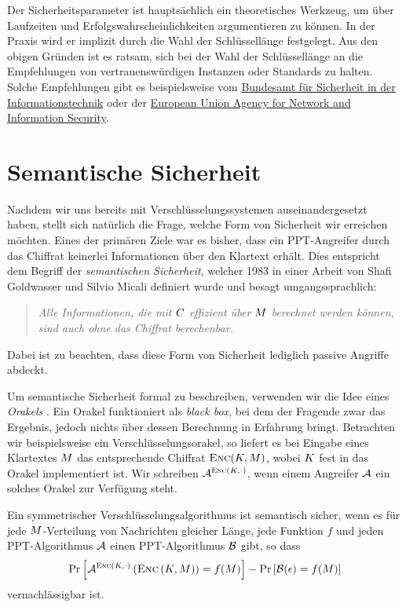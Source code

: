 Der Sicherheitsparameter ist hauptsächlich ein theoretisches Werkzeug,
um über Laufzeiten und Erfolgswahrscheinlichkeiten argumentieren zu
können. In der Praxis wird er implizit durch die Wahl der Schlüssellänge
festgelegt. Aus den obigen Gründen ist es ratsam, sich bei der Wahl der
Schlüssellänge an die Empfehlungen von vertrauenswürdigen Instanzen oder
Standards zu halten. Solche Empfehlungen gibt es beispielsweise vom
\href{https://www.bsi.bund.de/DE/Publikationen/TechnischeRichtlinien/tr02102/index_htm.html}{Bundesamt
  für Sicherheit in der Informationstechnik} oder der
\href{https://www.enisa.europa.eu/activities/identity-and-trust/library/deliverables/algorithms-key-size-and-parameters-report-2014}{European
  Union Agency for Network and Information Security}.

\section{Semantische  Sicherheit}
\label{ch:sicherheitsbegriffe:semantischesicherheit} Nachdem
wir uns bereits mit Verschlüsselungssystemen auseinandergesetzt haben,
stellt sich natürlich die Frage, welche Form von Sicherheit wir
erreichen möchten.  Eines der primären Ziele war es bisher, dass ein
PPT-Angreifer \indexPPTAdv durch das Chiffrat keinerlei Informationen
über den Klartext erhält. Dies entspricht dem Begriff der
\emph{semantischen Sicherheit}, welcher 1983 in einer Arbeit von Shafi
Goldwasser und Silvio Micali \cite{Goldwasser1984} definiert wurde und
besagt umgangssprachlich:
\begin{quote} \emph{Alle Informationen, die mit $C$ effizient
    über $M$ berechnet werden können, sind auch ohne das Chiffrat
    berechenbar.}
\end{quote} Dabei ist zu beachten, dass diese Form von Sicherheit
lediglich passive Angriffe abdeckt.

Um semantische Sicherheit formal zu beschreiben, verwenden wir die Idee
eines \emph{Orakels} \indexOracle. Ein Orakel funktioniert als
\emph{black box}, bei dem der Fragende zwar das Ergebnis, jedoch nichts
über dessen Berechnung in Erfahrung bringt. Betrachten wir
beispielsweise ein Verschlüsselungsorakel, so liefert es bei Eingabe
eines Klartextes $M$ das entsprechende Chiffrat $\textsc{Enc}(K,
M)$, wobei $K$ fest in das Orakel implementiert ist. Wir
schreiben $\mathcal{A}^{\textsc{Enc} (K, \cdot)}$, wenn einem Angreifer $\mathcal{A}$ ein
solches Orakel zur Verfügung steht.

\begin{definition}\label{def:semsec} Ein
  symmetrischer Verschlüsselungsalgorithmus ist semantisch sicher, wenn es
  für jede $M$-Verteilung von Nachrichten gleicher Länge, jede
  Funktion $f$ und jeden PPT-Algorithmus $\mathcal{A}$ einen PPT-Algorithmus $\mathcal{B}$
  gibt, so dass
  \begin{align*} \text{Pr}\left[ \mathcal{A}^{\textsc{Enc} (K,\cdot)} \left( \textsc{Enc} \left(
    K, M \right) \right) = f(M) \right] - \text{Pr} \left[ \mathcal{B}
    (\epsilon) = f (M) \right]
  \end{align*} vernachlässigbar ist.
\end{definition}


